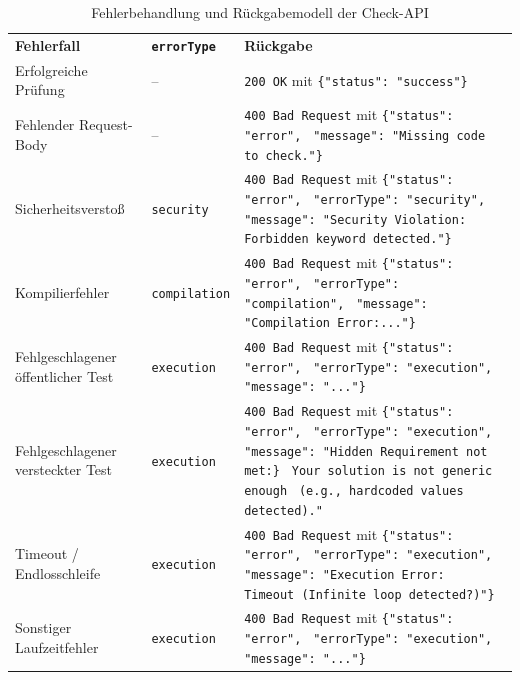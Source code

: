 \begin{table}[h]
	\caption{Fehlerbehandlung und Rückgabemodell der Check-API}
	\label{tab:check-api-fehlerbehandlung}
	\begin{tabular}{p{3.1cm} p{2.5cm} p{8.5cm}}
		\textbf{Fehlerfall} & \textbf{\texttt{errorType}} & \textbf{Rückgabe} \\
		
		Erfolgreiche Prüfung &
		-- &
		\texttt{200 OK} mit \verb|{"status": "success"}| \\
		
		Fehlender Request-Body &
		-- &
		\texttt{400 Bad Request} mit \verb|{"status": "error",|
			\verb| "message": "Missing code to check."}| \\
		
		Sicherheitsverstoß &
		\texttt{security} &
		\texttt{400 Bad Request} mit \verb|{"status": "error",|
			\verb| "errorType": "security",|
			\verb| "message": "Security Violation:|
			\verb| Forbidden keyword detected."}|\\
		
		Kompilierfehler &
		\texttt{compilation} &
		\texttt{400 Bad Request} mit \verb|{"status": "error",|
			\verb| "errorType": "compilation",|
			\verb| "message": "Compilation Error:..."}| \\
		
		Fehlgeschlagener öffentlicher Test &
		\texttt{execution} &
		\texttt{400 Bad Request} mit \verb|{"status": "error",|
			\verb| "errorType": "execution",|
			\verb| "message": "..."}| \\
		
		Fehlgeschlagener versteckter Test &
		\texttt{execution} &
		\texttt{400 Bad Request} mit \verb|{"status": "error",|
			\verb| "errorType": "execution",|
			\verb| "message": "Hidden Requirement not met:}| 
			\verb| Your solution is not generic enough|
			\verb| (e.g., hardcoded values detected)."|\\
		
		Timeout / Endlosschleife &
		\texttt{execution} &
		\texttt{400 Bad Request} mit \verb|{"status": "error",|
			\verb| "errorType": "execution",|
			\verb| "message": "Execution Error:| 
			\verb| Timeout (Infinite loop detected?)"}|\\
		
		Sonstiger Laufzeitfehler &
		\texttt{execution} &
		\texttt{400 Bad Request} mit \verb|{"status": "error",|
			\verb| "errorType": "execution",|
			\verb| "message": "..."}| \\
	\end{tabular}
\end{table}


